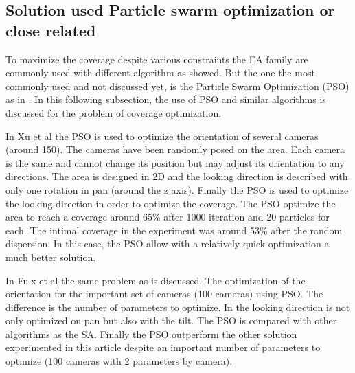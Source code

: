\subsection{Solution used Particle swarm optimization or close related}	

To maximize the coverage despite various constraints the EA family are commonly used with different algorithm as showed. But the one the most commonly used and not discussed yet, is the Particle Swarm Optimization (PSO) as in \cite{84*xu2011,8*zhou2011,33*reddy2012,143*maji2015,193*fu2014,194*fu2010,200*kulkarni2011}. In this following subsection, the use of PSO and similar algorithms is discussed for the problem of coverage optimization. 

 In Xu et al \cite{84*xu2011} the PSO is used to optimize the orientation of several cameras (around 150).
The cameras have been randomly posed on the area. Each camera is the same and cannot change its position but may adjust its orientation to any directions. The area is designed in 2D and the looking direction is described with only one rotation in pan (around  the z axis).  
Finally the PSO is used to optimize the looking direction in order to optimize the coverage. The PSO optimize the area to reach a coverage around 65\% after 1000 iteration and 20 particles for each. The intimal coverage in the experiment was around 53\% after the random dispersion. In this case, the PSO allow with a relatively quick optimization a much better solution.

In Fu.x et al \cite{194*fu2010} the same problem as \cite{84*xu2011} is discussed. The optimization of the orientation for the important set of cameras (100 cameras) using PSO. The difference is the number of parameters to optimize. In \cite{194*fu2010} the looking direction is not only optimized on pan but also with the tilt.  
The PSO is compared with other algorithms as the SA. Finally the PSO outperform the other solution experimented in this article despite an important number of parameters to optimize (100 cameras with 2 parameters by camera).

